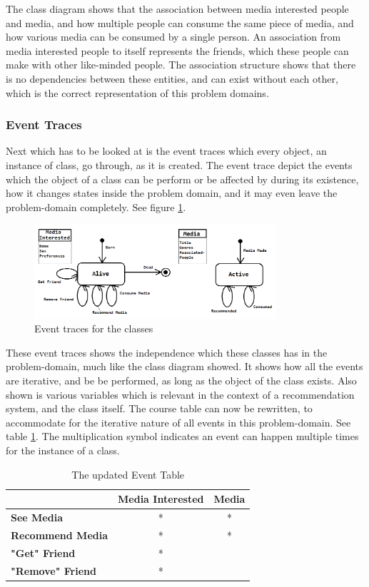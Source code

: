 The class diagram shows that the association between media interested people and media, and how multiple people can consume the same piece of media, and how various media can be consumed by a single person. An association from media interested people to itself represents the friends, which these people can make with other like-minded people. The association structure shows that there is no dependencies between these entities, and can exist without each other, which is the correct representation of this problem domains.

\subsubsection{Event Traces}

Next which has to be looked at is the event traces which every object, an instance of class, go through, as it is created. The event trace depict the events which the object of a class can be perform or be affected by during its existence, how it changes states inside the problem domain, and it may even leave the problem-domain completely. See figure \ref{Courses}.

\begin{figure}[htb]
\centering
\includegraphics[width=0.8\textwidth]{Images/courses.png}
\caption{Event traces for the classes}
\label{Courses}
\end{figure}

These event traces shows the independence which these classes has in the problem-domain, much like the class diagram showed. It shows how all the events are iterative, and be be performed, as long as the object of the class exists. Also shown is various variables which is relevant in the context of a recommendation system, and the class itself. The course table can now be rewritten, to accommodate for the iterative nature of all events in this problem-domain. See table \ref{UpdatedEventTable}. The multiplication symbol indicates an event can happen multiple times for the instance of a class.

\begin{table}[htb]
\centering
\begin{tabular}{|l|c|c|} \hline
	  & \textbf{Media Interested} & \textbf{Media} \\ \hline
	\textbf{See Media} & * & * \\ \hline
	\textbf{Recommend Media} & * & * \\ \hline
	\textbf{"Get" Friend} & * &  \\ \hline
	\textbf{"Remove" Friend} & * &  \\ \hline
\end{tabular}
\caption{The updated Event Table}
\label{UpdatedEventTable}
\end{table}
